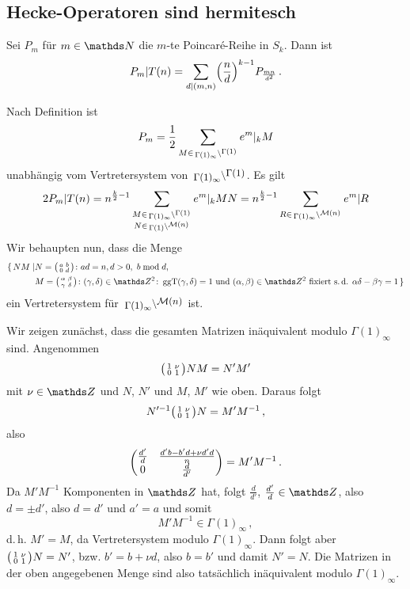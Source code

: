 \subsection{Hecke-Operatoren sind hermitesch}

\begin{satz}\label{Hecke(Pm)}
Sei $P_m$ für $m \in \NN$ die $m$-te Poincaré-Reihe in $S_k$.
Dann ist
\[
	P_m | T(n) = \sum_{d | (m,n)} \Bigl( \frac{n}{d} \Bigr)^{k-1} P_{\frac{mn}{d^2}}
\,.
\]
\end{satz}
\begin{bewe}
Nach Definition ist
\[
P_m = \frac{1}{2} \sum_{M\in \linksmodulo{\Gamma(1)_\infty}{\Gamma(1)}} e^m |_k M
\]
unabhängig vom Vertretersystem von $\linksmodulo{\Gamma(1)_\infty}{\Gamma(1)}$.
Es gilt
\[
2 P_m | T(n) = n^{\frac{k}{2}-1} \sum_{\substack{M \in \linksmodulo{\Gamma(1)_\infty}{\Gamma(1)}\\ N \in \linksmodulo{\Gamma(1)}{\mathcal{M}(n)}}} e^m|_k MN
= n^{\frac{k}{2}-1} \sum_{R \in \linksmodulo{\Gamma(1)_\infty}{\mathcal{M}(n)}} e^m|R
\]
Wir behaupten nun, dass die Menge 
\begin{equation*}
\begin{split}
\{\,NM \mid &N = \mymat ab0d\colon ad=n, d>0,\ b \bmod d, \\ &M = \mymat \alpha\beta\gamma\delta\colon (\gamma, \delta) \in \ZZ^2\colon \ggt(\gamma, \delta) = 1 \text{ und } (\alpha, \beta) \in \ZZ^2 \text{ fixiert s.\,d. } \alpha\delta - \beta\gamma = 1\,\}
\end{split}
\end{equation*}
ein Vertretersystem für $\linksmodulo{\Gamma(1)_\infty}{\mathcal{M}(n)}$ ist.

Wir zeigen zunächst, dass die gesamten Matrizen inäquivalent modulo $\Gamma(1)_\infty$ sind.
Angenommen
\[
\mymat 1\nu01 NM = N'M'
\]
mit $\nu \in \ZZ$ und $N$, $N'$ und $M$, $M'$ wie oben.
Daraus folgt
\[
N'^{-1} \mymat 1\nu01 N = M'M^{-1}
\,,
\]
also
\[
\mymat*{\frac{d'}{d}}{\frac{d'b-b'd+\nu d'd}{n}}{0}{\frac{d}{d'}}
= M' M^{-1}
\,.
\]
Da $M'M^{-1}$ Komponenten in $\ZZ$ hat, folgt $\frac{d}{d'}$, $\frac{d'}{d} \in \ZZ$, also $d = \pm d'$, also $d = d'$ und $a' = a$ und somit 
\[
M'M^{-1} \in \Gamma(1)_\infty
\,,
\]
d.\,h. $M' = M$, da Vertretersystem modulo $\Gamma(1)_\infty$.
Dann folgt aber $\mymat 1\nu01 N = N'$, bzw. $b' = b + \nu d$, also $b = b'$ und damit $N' = N$. Die Matrizen in der oben angegebenen Menge sind also tatsächlich inäquivalent modulo $\Gamma(1)_\infty$. 


\end{bewe}
